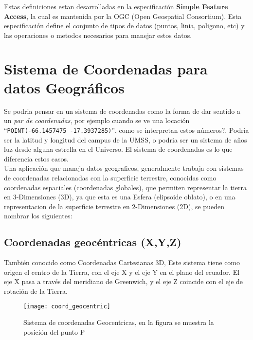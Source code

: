     Estas definiciones estan desarrolladas en la especificaci\'on \textbf{Simple Feature Access}, la cual es mantenida por la OGC (Open Geospatial Consortium). Esta especificaci\'on define el conjunto de tipos de datos (puntos, linia, poligono, etc) y las operaciones o metodos necesarios para manejar estos datos.
    
  \section{Sistema de Coordenadas para datos Geográficos} %
  \label{sec:sistema_de_coordenadas_para_datos_geograficos}
    Se podria pensar en un sistema de coordenadas como la forma de dar sentido a un \emph{par de coordenadas}, por ejemplo cuando se ve una locaci\'on ``\verb|POINT(-66.1457475 -17.3937285)|'', como se interpretan estos n\'umeros?.
    Podria ser la latitud y longitud del campus de la UMSS, o podria ser un sistema de a\~nos luz desde alguna estrella en el Universo.
    El sistema de coordenadas es lo que diferencia estos casos.\\


    Una aplicaci\'on que maneja datos geograficos, generalmente trabaja con sistemas de coordenadas relacionadas con la superficie terrestre, conocidas como coordenadas espaciales (coordenadas globales), que permiten representar la tierra en 3-Dimensiones (3D), ya que esta es una Esfera (elipsoide oblato), o en una representacion de la superficie terrestre en 2-Dimensiones (2D), se pueden nombrar los siguientes:

    \subsection{Coordenadas geocéntricas (X,Y,Z)} %
      \label{sub:coordenadas_geocentricas}
        También conocido como Coordenadas Cartesianas 3D, Este sistema tiene como origen el centro de la Tierra, con el eje X y el eje Y en el plano del ecuador. El eje X pasa a través del meridiano de Greenwich, y el eje Z  coincide con el eje de rotación de la Tierra.

        \begin{figure}[!hbp]
          \begin{center}
            \texttt{[image: coord\_geocentric]}
          \end{center}
          \caption[Sistema de coordenadas Geocentricas ]{Sistema de coordenadas Geocentricas, en la figura se muestra la posici\'on del punto P}
          \label{fig:coord_geocentric}
        \end{figure}

